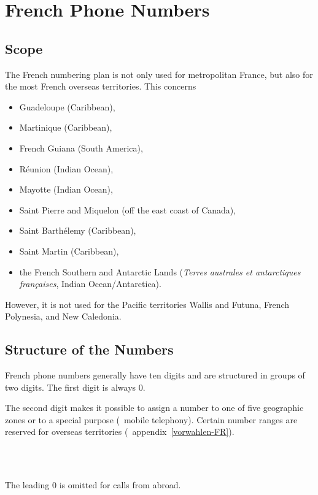 \documentclass[numbers=noenddot]{scrreprt}
\newcommand\Abschnittsliteratur[1]{\bgroup
\small
\raggedright
\printbibliography[heading=subbibnumbered,keyword=#1]
\egroup}
\newcommand\UeberschriftGeltungsbereich{\section{Scope}}
\newcommand\UeberschriftAufbau{\section{Structure of the Numbers}}
\newcommand*\vglAnhang[1]{(\cf\ appendix~\ref{#1})}
\begin{document}
\Abschnittsliteratur{austrian}

\chapter{French Phone Numbers}
\UeberschriftGeltungsbereich \label{FR-bereich}
The French numbering plan
\cite{ARCEP}
is not only used for metropolitan France, but also for the most French overseas territories. This concerns
\begin{itemize}
\item Guadeloupe (Caribbean),
\item Martinique (Caribbean),
\item French Guiana (South America),
\item R\'eunion (Indian Ocean),
\item Mayotte (Indian Ocean),
\item Saint Pierre and Miquelon (off the east coast of Canada),
\item Saint Barth\'elemy (Caribbean),
\item Saint Martin (Caribbean),
\item the French Southern and Antarctic Lands (\emph{\foreignlanguage{french}{Terres australes et antarctiques françaises}}, Indian Ocean/Antarctica).
\end{itemize}
However, it is not used for the Pacific territories Wallis and Futuna, French Polynesia, and New Caledonia.

\UeberschriftAufbau
French phone numbers generally have ten digits and are structured in groups of two digits. The first digit is always 0.
\begin{sidebyside}
\end{sidebyside}
The second digit makes it possible to assign a number to one of five geographic zones or to a special purpose (\eg\ mobile telephony). Certain number ranges are reserved for overseas territories
\vglAnhang{vorwahlen-FR}.
\begin{sidebyside}
   \\
   \\
\end{sidebyside}

The leading 0 is omitted for calls from abroad.
\begin{sidebyside}
\end{sidebyside}
\end{document}
